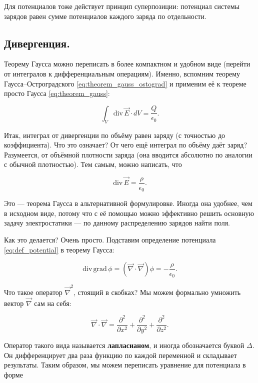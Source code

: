 \documentclass[11pt,a4paper]{article}
\numberwithin{equation}{section}
\newcommand{\pt}{\partial}
\newcommand{\grad}{\mathrm{grad}\,}
\renewcommand{\div}{\mathrm{div}\,}
\newcommand{\vn}{\vec{\nabla}}
\newcommand{\eps}{\epsilon}
\begin{document}
Для потенциалов тоже действует принцип суперпозиции: потенциал системы
зарядов равен сумме потенциалов каждого заряда по отдельности. 

\subsection{Дивергенция.}
\label{sec:statics_div}

Теорему Гаусса можно переписать в более компактном и удобном виде
(перейти от интегралов к дифференциальным операциям). Именно, вспомним
теорему Гаусса--Остроградского \eqref{eq:theorem_gauss_ostograd} и
применим её к теореме просто Гаусса \eqref{eq:theorem_gauss}:

\begin{equation}
  \label{eq:statics_div_1}
  \int_V \div \vec{E} \cdot dV = \frac{Q}{\eps_0}.
\end{equation}

Итак, интеграл от дивергенции по объёму равен заряду (с точностью до
коэффициента). Что это означает? От чего ещё интеграл по объёму даёт
заряд? Разумеется, от объёмной плотности заряда (она вводится
абсолютно по аналогии с обычной плотностью). Тем самым, можно
написать, что 

\begin{equation}
  \label{eq:statics_div_2}
  \div \vec{E} = \frac{\rho}{\eps_0}.
\end{equation}

Это --- теорема Гаусса в альтернативной формулировке. Иногда она
удобнее, чем в исходном виде, потому что с её помощью можно эффективно
решить основную задачу электростатики --- по данному распределению
зарядов найти поля. 

Как это делается? Очень просто. Подставим определение потенциала
\eqref{eq:def_potential} в теорему Гаусса:

\begin{equation}
  \label{eq:poisson_1}
  \div \grad \phi =( \vn \cdot \vn) \phi =  -\frac{\rho}{\eps_0}. 
\end{equation}

Что такое оператор $\vn^2$, стоящий в скобках? Мы можем формально
умножить вектор $\vn$ сам на себя: 

\begin{equation}
  \label{eq:poisson_2}
  \vn \cdot \vn = \frac{\pt^2}{\pt x^2} + \frac{\pt^2}{\pt y^2} + \frac{\pt^2}{\pt z^2}.
\end{equation}

Оператор такого вида называется \textbf{лапласианом}, и иногда
обозначается буквой $\Delta$. Он дифференцирует два раза функцию по
каждой переменной и складывает результаты. Таким образом, мы можем
переписать уравнение для потенциала в форме
\end{document}
